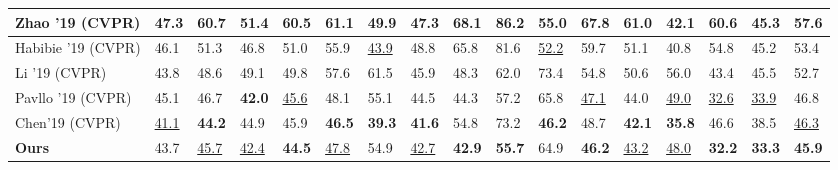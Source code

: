 \documentclass[runningheads]{llncs}
\begin{document}
\begin{table}
\begin{center}
\begin{tabular}{|l|l|l|l|l|l|l|l|l|l|l|l|l|l|l|l|l| }
Zhao '19 (CVPR) & 47.3 & 60.7 & 51.4 & 60.5 & 61.1 & 49.9 & 47.3 & 68.1 & 86.2 & 55.0 & 67.8 & 61.0 & 42.1 & 60.6 & 45.3 & 57.6 \\ \hline
Habibie '19 (CVPR) & 46.1 &  51.3 & 46.8 & 51.0 & 55.9 & \underline{43.9} & 48.8 & 65.8 & 81.6 & \underline{52.2} & 59.7 &51.1 & 40.8 & 54.8 & 45.2 & 53.4  \\ \hline
Li '19 (CVPR)  & 43.8 & 48.6 & 49.1 & 49.8 & 57.6 &  61.5 &  45.9 &  48.3 &  62.0 &  73.4 &  54.8 & 50.6 & 56.0 & 43.4 & 45.5 & 52.7  \\ \hline
Pavllo '19 (CVPR) & 45.1 & 46.7 & \textbf{42.0} & \underline{45.6} & 48.1 & 55.1 & 44.5 & 44.3 & 57.2 & 65.8 & \underline{47.1} & 44.0 & \underline{49.0} & \underline{32.6} & \underline{33.9} & 46.8\\ \hline
Chen'19 (CVPR) & \underline{41.1} & \textbf{44.2} & 44.9 & 45.9 & \textbf{46.5} & \textbf{39.3} & \textbf{41.6} & 54.8 & 73.2 & \textbf{46.2} & 48.7 & \textbf{42.1} & \textbf{35.8} & 46.6 & 38.5 & \underline{46.3} \\ \hline

\textbf{Ours} &

43.7 &

\underline{45.7} &

\underline{42.4} &

\textbf{44.5} &

\underline{47.8} &

54.9 &

\underline{42.7} &

\textbf{42.9} &

\textbf{55.7} &

64.9 &

\textbf{46.2} &

\underline{43.2} &

\underline{48.0} &

\textbf{32.2} &

\textbf{33.3} &

\textbf{45.9}

\\ \hline

\end{tabular}
\end{center}
\label{table:mpjpe}
\end{table}
\end{document}
